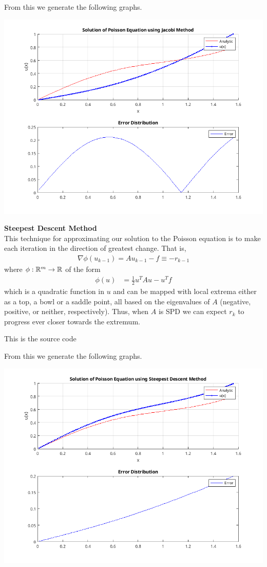 \documentclass[10pt,a4paper]{report}
\begin{document}
From this we generate the following graphs.%

\includegraphics[scale=0.5]{ml04c.png} 

\noindent\textbf{Steepest Descent Method}\\

This technique for approximating our solution to the Poisson equation is to make each iteration in the direction of greatest change.  That is, 
\begin{align*}
	\nabla \phi(u_{k-1}) = Au_{k-1}-f \equiv -r_{k-1}
\end{align*}where $\phi: \mathbb{R}^m \to \mathbb{R}$ of the form
\begin{align*}
	\phi(u) &= \frac{1}{2}u^TAu-u^Tf
\end{align*}which is a quadratic function in $u$ and can be mapped with local extrema either as a top, a bowl or a saddle point, all based on the eigenvalues of $A$ (negative, positive, or neither, respectively).  Thus, when $A$ is SPD we can expect $r_{k}$ to progress ever closer towards the extremum.

This is the source code
	

From this we generate the following graphs.

\includegraphics[scale=0.5]{ml04d.png} 
\end{document}
